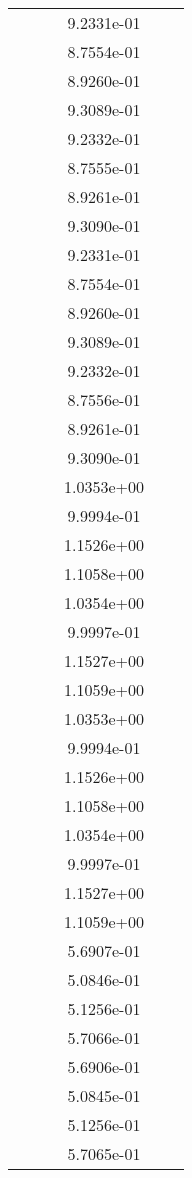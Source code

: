 \begin{xltabular}{\textwidth}{r|rS[table-format=1.3e+2]S[table-format=1.4e+2]S[table-format=1.4e+2]S[table-format=-1.5]}
&  &  & 9.2331e-01 & & \\
&  &  & 8.7554e-01 & & \\
&  &  & 8.9260e-01 & & \\
&  &  & 9.3089e-01 & & \\
&  &  & 9.2332e-01 & & \\
&  &  & 8.7555e-01 & & \\
&  &  & 8.9261e-01 & & \\
&  &  & 9.3090e-01 & & \\
&  &  & 9.2331e-01 & & \\
&  &  & 8.7554e-01 & & \\
&  &  & 8.9260e-01 & & \\
&  &  & 9.3089e-01 & & \\
&  &  & 9.2332e-01 & & \\
&  &  & 8.7556e-01 & & \\
&  &  & 8.9261e-01 & & \\
&  &  & 9.3090e-01 & & \\
&  &  & 1.0353e+00 & & \\
&  &  & 9.9994e-01 & & \\
&  &  & 1.1526e+00 & & \\
&  &  & 1.1058e+00 & & \\
&  &  & 1.0354e+00 & & \\
&  &  & 9.9997e-01 & & \\
&  &  & 1.1527e+00 & & \\
&  &  & 1.1059e+00 & & \\
&  &  & 1.0353e+00 & & \\
&  &  & 9.9994e-01 & & \\
&  &  & 1.1526e+00 & & \\
&  &  & 1.1058e+00 & & \\
&  &  & 1.0354e+00 & & \\
&  &  & 9.9997e-01 & & \\
&  &  & 1.1527e+00 & & \\
&  &  & 1.1059e+00 & & \\
&  &  & 5.6907e-01 & & \\
&  &  & 5.0846e-01 & & \\
&  &  & 5.1256e-01 & & \\
&  &  & 5.7066e-01 & & \\
&  &  & 5.6906e-01 & & \\
&  &  & 5.0845e-01 & & \\
&  &  & 5.1256e-01 & & \\
&  &  & 5.7065e-01 & & \\

\end{xltabular}
